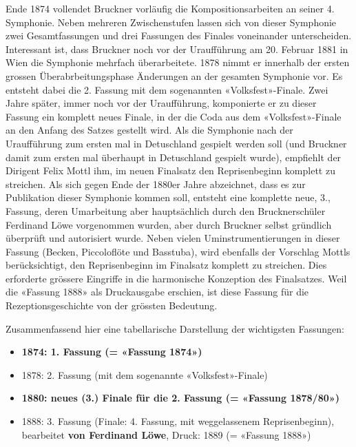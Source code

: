 Ende 1874 vollendet Bruckner vorläufig die Kompositionsarbeiten an seiner 4. Symphonie.
Neben mehreren Zwischenstufen lassen sich von dieser Symphonie zwei Gesamtfassungen und drei Fassungen des Finales voneinander unterscheiden.
Interessant ist, dass Bruckner noch vor der Uraufführung am 20. Februar 1881 in Wien die Symphonie mehrfach überarbeitete.
1878 nimmt er innerhalb der ersten grossen Überabrbeitungsphase Änderungen an der gesamten Symphonie vor.
Es entsteht dabei die 2. Fassung mit dem sogenannten «Volksfest»-Finale.
Zwei Jahre später, immer noch vor der Uraufführung, komponierte er zu dieser Fassung ein komplett neues Finale, in der die Coda aus dem «Volksfest»-Finale an den Anfang des Satzes gestellt wird.
Als die Symphonie nach der Uraufführung zum ersten mal in Detuschland gespielt werden soll (und Bruckner damit zum ersten mal überhaupt in Detuschland gespielt wurde), empfiehlt der Dirigent Felix Mottl ihm, im neuen Finalsatz den Reprisenbeginn komplett zu streichen.
Als sich gegen Ende der 1880er Jahre abzeichnet, dass es zur Publikation dieser Symphonie kommen soll, entsteht eine komplette neue, 3., Fassung, deren Umarbeitung aber hauptsächlich durch den Brucknerschüler Ferdinand Löwe vorgenommen wurden, aber durch Bruckner selbst gründlich überprüft und autorisiert wurde.
Neben vielen Uminstrumentierungen in dieser Fassung (Becken, Piccoloflöte und Basstuba), wird ebenfalls der Vorschlag Mottls berücksichtigt, den Reprisenbeginn im Finalsatz komplett zu streichen.
Dies erforderte grössere Eingriffe in die harmonische Konzeption des Finalsatzes.
Weil die «Fassung 1888» als Druckausgabe erschien, ist diese Fassung für die Rezeptionsgeschichte von der grössten Bedeutung.

Zusammenfassend hier eine tabellarische Darstellung der wichtigsten Fassungen\autocite{wiki:bruckner4}:

\begin{itemize}
	\item \textbf{1874: 1. Fassung (= «Fassung 1874»)}
	\item 1878: 2. Fassung (mit dem sogenannte «Volksfest»-Finale)
	\item \textbf{1880: neues (3.) Finale für die 2. Fassung (= «Fassung 1878/80»)}
	\item 1888: 3. Fassung (Finale: 4. Fassung, mit weggelassenem Reprisenbeginn), bearbeitet \textbf{von Ferdinand Löwe}, Druck: 1889 (= «Fassung 1888»)
\end{itemize}

